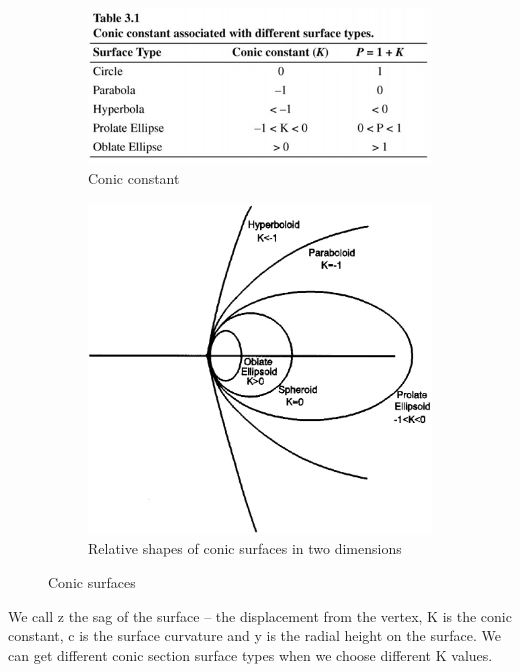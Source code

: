 \documentclass[../main.tex]{subfiles}
\begin{document}
	\begin{figure}[h!]
		\centering
		\begin{subfigure}[b]{0.5\linewidth}
			\includegraphics[width=\linewidth]{../graphics/aspheric_2.png}
			\caption{Conic constant}
		\end{subfigure}
		\begin{subfigure}[b]{0.3\linewidth}
			\includegraphics[width=\linewidth]{../graphics/aspheric_3.png}
			\caption{Relative shapes of conic surfaces in two dimensions}
		\end{subfigure}
		\caption{Conic surfaces}
	  	\label{fig:conic_constant}	  
	\end{figure}
	We call z the sag of the surface -- the displacement from the vertex, K is the conic constant, c is the surface curvature and y is the radial height on the surface.
	We can get different conic section surface types when we choose different K values.
\end{document}
